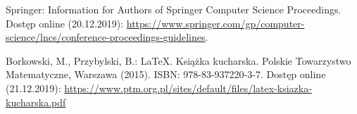 Springer: Information for Authors of Springer Computer Science Proceedings. Dostęp online (20.12.2019):
\url{https://www.springer.com/gp/computer-science/lncs/conference-proceedings-guidelines}.

Borkowski, M., Przybylski, B.: \LaTeX. Książka kucharska. Polskie Towarzystwo Matematyczne, Warszawa (2015). ISBN: 978-83-937220-3-7. Dostęp online (21.12.2019):
\url{https://www.ptm.org.pl/sites/default/files/latex-ksiazka-kucharska.pdf}
